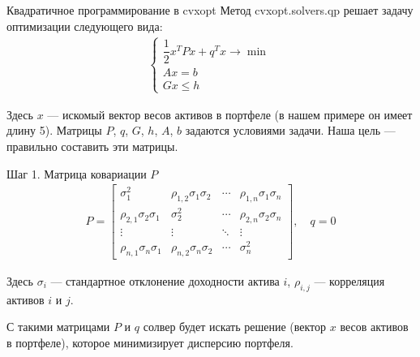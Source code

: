 \documentclass{beamer}
\begin{document}
\begin{frame}{Квадратичное программирование в cvxopt}
\justify
Метод cvxopt.solvers.qp решает задачу оптимизации следующего вида:
\begin{align*}
\begin{cases}
\dfrac{1}{2}x^TPx + q^Tx \to \min \\
Ax = b \\
Gx \le h 
\end{cases}
\end{align*}

\justify
Здесь $x$ --- искомый вектор весов активов в портфеле (в нашем примере он имеет длину 5). Матрицы $P$, $q$, $G$, $h$, $A$, $b$ задаются условиями задачи. Наша цель --- правильно составить эти матрицы.
\end{frame}



\begin{frame}{Шаг 1. Матрица ковариации $P$}
\justify
\begin{align*}
P = \begin{bmatrix}
\sigma_1^2 & \rho_{1,2}\sigma_1\sigma_2 & \cdots & \rho_{1,n}\sigma_1\sigma_n \\
\rho_{2,1}\sigma_2\sigma_1 & \sigma_2^2 & \cdots & \rho_{2,n}\sigma_2\sigma_n \\
\vdots & \vdots & \ddots & \vdots \\
\rho_{n,1}\sigma_n\sigma_1 & \rho_{n,2}\sigma_n\sigma_2 & \cdots & \sigma_n^2
\end{bmatrix},
\quad
q = 0
\end{align*}

Здесь $\sigma_i$ --- стандартное отклонение доходности актива $i$, $\rho_{i,j}$ --- корреляция активов $i$ и $j$. 

\justify
С такими матрицами $P$ и $q$ солвер будет искать решение (вектор $x$ весов активов в портфеле), которое минимизирует дисперсию портфеля.
\end{frame}
\end{document}
